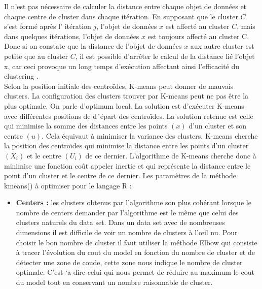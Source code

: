 Il n’est pas nécessaire de calculer la distance entre chaque objet de données et chaque centre de cluster dans chaque itération. En supposant que le cluster \(\displaystyle C \) s'est formé après l' itération \(\displaystyle j \), l'objet de données \(\displaystyle x \) est affecté au cluster \(\displaystyle C \), mais dans quelques itérations, l'objet de données \(\displaystyle x \) est toujours affecté au cluster C. Donc si on constate que la distance de l'objet de données \(\displaystyle x \) aux autre cluster est petite que au cluster \(\displaystyle C \), il est possible d’arrêter le calcul de la distance lié l’objet x, car ceci provoque un long temps d'exécution affectant ainsi l'efficacité du clustering \cite{na2010research}. \\

Selon la position initiale des centroïdes, K-means peut donner de mauvais clusters. La configuration des clusters trouver par K-means peut ne pas être la plus optimale. On parle d’optimum local. La solution est d’exécuter K-means avec différentes positions de d´épart des centroïdes. La solution retenue est celle qui minimise la somme des distances entre les points \(\displaystyle (x) \) d’un cluster et son centre \(\displaystyle (u) \). Cela équivaut à minimiser la variance des clusters. K-means cherche la position des centroïdes qui minimise la distance entre les points
d’un cluster \(\displaystyle (X_{i}) \) et le centre \(\displaystyle (U_{i}) \) de ce dernier. L'algorithme de K-means cherche donc à minimise une fonction coût appeler inertie et qui représente la distance entre le point d’un cluster et le centre de ce dernier. Les paramètres de la méthode kmeans() à optimiser pour le langage R :

\begin{itemize}
	\item  \textbf{Centers :} les clusters obtenus par l’algorithme son plus cohérant lorsque le nombre de centers demander par l’algorithme est le même que celui des clusters naturels du data set. Dans un data set avec de nombreuses dimensions il est difficile de voir un nombre de clusters à l’œil nu. Pour choisir le bon nombre de cluster il faut utiliser la méthode Elbow qui consiste à tracer l’évolution du cout du model en fonction du nombre de cluster et de détecter une zone de coude, cette zone nous indique le nombre de cluster optimale. C’est-`a-dire celui qui nous permet de réduire au maximum le cout du model tout en conservant un nombre raisonnable de cluster.
\end{itemize}

